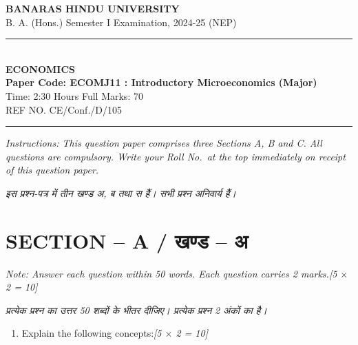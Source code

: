 \documentclass[11pt,a4paper]{article}
\newcommand{\pts}[1]{\hfill \textit{[#1]}}
\begin{document}
\begin{center}
  {\large\bfseries BANARAS HINDU UNIVERSITY}\\[2pt]
  {\normalsize B. A. (Hons.) Semester I Examination, 2024-25 (NEP)}\\[6pt]
  \rule{0.8\linewidth}{0.5pt}\\[6pt]
  {\large\bfseries ECONOMICS}\\[4pt]
  {\large\bfseries Paper Code: ECOMJ11 : Introductory Microeconomics (Major)}\\[4pt]
  {\normalsize Time: 2:30 Hours \hfill Full Marks: 70}\\[2pt]
  {\small REF NO. CE/Conf./D/105}
\end{center}
\rule{\linewidth}{0.4pt}
\smallskip

\noindent \textit{Instructions: This question paper comprises three Sections A, B and C. All questions are compulsory. Write your Roll No.\ at the top immediately on receipt of this question paper.}

\smallskip
\noindent \textit{इस प्रश्न-पत्र में तीन खण्ड अ, ब तथा स हैं। सभी प्रश्न अनिवार्य हैं।}

\bigskip

\section*{SECTION -- A / खण्ड -- अ}
\noindent \textit{Note: Answer each question within 50 words. Each question carries 2 marks.}\pts{5 $\times$ 2 = 10}

\noindent \textit{प्रत्येक प्रश्न का उत्तर 50 शब्दों के भीतर दीजिए। प्रत्येक प्रश्न 2 अंकों का है।}

\begin{enumerate}[label=\textbf{\arabic*.},leftmargin=*,itemsep=8pt]
  \item Explain the following concepts:\pts{5 $\times$ 2 = 10}
\end{enumerate}

\bigskip
\end{document}
